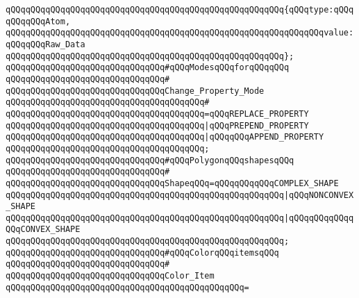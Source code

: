 \verb|qQQqqQQqqQQqqQQqqQQqqQQqqQQqqQQqqQQqqQQqqQQqqQQqqQQqqQQq{qQQqtype:qQQqqQQqqQQqAtom,|\newline
\verb|qQQqqQQqqQQqqQQqqQQqqQQqqQQqqQQqqQQqqQQqqQQqqQQqqQQqqQQqqQQqqQQqvalue:qQQqqQQqRaw_Data|\newline
\verb|qQQqqQQqqQQqqQQqqQQqqQQqqQQqqQQqqQQqqQQqqQQqqQQqqQQqqQQq};|\newline
\newline
\verb|qQQqqQQqqQQqqQQqqQQqqQQqqQQqqQQq#qQQqModesqQQqforqQQqqQQq|\newline
\verb|qQQqqQQqqQQqqQQqqQQqqQQqqQQqqQQq#|\newline
\verb|qQQqqQQqqQQqqQQqqQQqqQQqqQQqqQQqChange_Property_Mode|\newline
\verb|qQQqqQQqqQQqqQQqqQQqqQQqqQQqqQQqqQQqqQQq#|\newline
\verb|qQQqqQQqqQQqqQQqqQQqqQQqqQQqqQQqqQQqqQQq=qQQqREPLACE_PROPERTY|\newline
\verb|qQQqqQQqqQQqqQQqqQQqqQQqqQQqqQQqqQQqqQQq|\verb#|qQQqPREPEND_PROPERTY#\newline
\verb|qQQqqQQqqQQqqQQqqQQqqQQqqQQqqQQqqQQqqQQq|\verb#|qQQqqQQqAPPEND_PROPERTY#\newline
\verb|qQQqqQQqqQQqqQQqqQQqqQQqqQQqqQQqqQQqqQQq;|\newline
\newline
\verb|qQQqqQQqqQQqqQQqqQQqqQQqqQQqqQQq#qQQqPolygonqQQqshapesqQQq|\newline
\verb|qQQqqQQqqQQqqQQqqQQqqQQqqQQqqQQq#|\newline
\verb|qQQqqQQqqQQqqQQqqQQqqQQqqQQqqQQqShapeqQQq=qQQqqQQqqQQqCOMPLEX_SHAPE|\newline
\verb|qQQqqQQqqQQqqQQqqQQqqQQqqQQqqQQqqQQqqQQqqQQqqQQqqQQqqQQq|\verb#|qQQqNONCONVEX_SHAPE#\newline
\verb|qQQqqQQqqQQqqQQqqQQqqQQqqQQqqQQqqQQqqQQqqQQqqQQqqQQqqQQq|\verb#|qQQqqQQqqQQqqQQqCONVEX_SHAPE#\newline
\verb|qQQqqQQqqQQqqQQqqQQqqQQqqQQqqQQqqQQqqQQqqQQqqQQqqQQqqQQq;|\newline
\newline
\verb|qQQqqQQqqQQqqQQqqQQqqQQqqQQqqQQq#qQQqColorqQQqitemsqQQq|\newline
\verb|qQQqqQQqqQQqqQQqqQQqqQQqqQQqqQQq#|\newline
\verb|qQQqqQQqqQQqqQQqqQQqqQQqqQQqqQQqColor_Item|\newline
\verb|qQQqqQQqqQQqqQQqqQQqqQQqqQQqqQQqqQQqqQQqqQQqqQQq=|\newline
